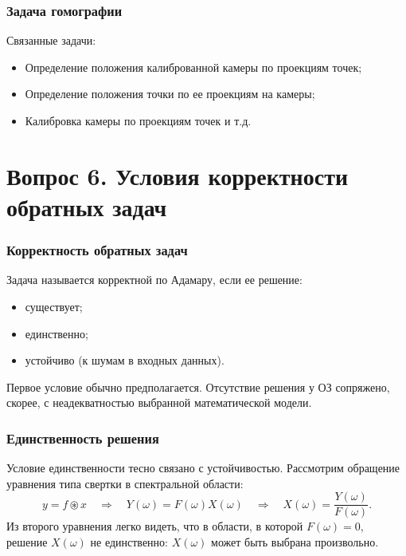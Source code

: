 \documentclass[compress]{beamer}
\begin{document}
    \begin{frame}\frametitle{Задача гомографии}

        Связанные задачи:
        \begin{itemize}
            \item Определение положения калиброванной камеры по проекциям точек;
            \item Определение положения точки по ее проекциям на камеры;
            \item Калибровка камеры по проекциям точек и т.д.
        \end{itemize}

    \end{frame}

    \section[Вопрос 6]{Вопрос 6. Условия корректности обратных задач}

    \begin{frame}\frametitle{Корректность обратных задач}

        Задача называется корректной по Адамару, если ее решение:
        \begin{itemize}
            \item существует;
            \item единственно;
            \item устойчиво (к шумам в входных данных).
        \end{itemize}

        Первое условие обычно предполагается. Отсутствие решения у ОЗ сопряжено, скорее, с неадекватностью выбранной математической модели.

    \end{frame}

    \begin{frame}\frametitle{Единственность решения}

        Условие единственности тесно связано с устойчивостью. Рассмотрим обращение уравнения типа свертки в спектральной области:
        \begin{equation*}
            y = f \circledast x \quad\Longrightarrow\quad
            Y(\omega) = F(\omega) X(\omega) \quad\Longrightarrow\quad
            X(\omega) = \frac{Y(\omega)}{F(\omega)} .
        \end{equation*}
        Из второго уравнения легко видеть, что в области, в которой $F(\omega) = 0$, решение $X(\omega)$ не единственно: $X(\omega)$ может быть выбрана произвольно.

    \end{frame}
\end{document}
